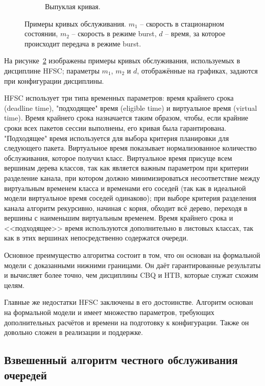 \begin{figure}[ht!]
\begin{subfigure}[b]{0.3\textwidth}
                \caption{Выпуклая кривая.}
                \label{pic:hfsc_convex}
            \end{subfigure}
			\caption{Примеры кривых обслуживания. $m_1$ -- скорость в стационарном состоянии,
			$m_2$ -- скорость в режиме burst, $d$ -- время, за которое происходит передача
			в режиме burst.\cite{hfscguide}}
			\label{pic:hfscline}
        \end{figure}

		На рисунке~\ref{pic:hfscline} изображены примеры кривых обслуживания, используемых
		в дисциплине HFSC; параметры $m_1$, $m_2$ и $d$, отображённые на графиках, задаются
		при конфигурации дисциплины.\cite{hfscguide}

        HFSC использует три типа временных параметров: время крайнего срока (deadline
        time), "подходящее" время (eligible time) и виртуальное время (virtual time). Время крайнего
        срока назначается таким образом, чтобы, если крайние сроки всех пакетов сессии
        выполнены, его кривая была гарантирована. "Подходящее" время используется для
        выбора критерия планировки для следующего пакета. Виртуальное время показывает
        нормализованное количество обслуживания, которое получил класс. Виртуальное
        время присуще всем вершинам дерева классов, так как является важным параметром
        при критерии разделение канала, при котором должно минимизироваться
        несоответствие между виртуальным временем класса и временами его соседей
        (так как в идеальной модели виртуальное время соседей одинаково); при выборе
        критерия разделения канала алгоритм рекурсивно, начиная с корня, обходит всё
        дерево, переходя в вершины с наименьшим виртуальным временем. Время крайнего
        срока и <<подходящее>> время используются дополнительно в листовых классах,
        так как в этих вершинах непосредственно содержатся очереди.\cite{hfsc}

		Основное преимущество алгоритма состоит в том, что он основан
		на формальной модели с доказанными нижними границами. Он даёт гарантированные
		результаты и вычисляет более точно, чем дисциплины CBQ и HTB, которые
		служат схожим целям.

		Главные же недостатки HFSC заключены в его достоинстве. Алгоритм основан
		на формальной модели и имеет множество параметров, требующих дополнительных
		расчётов и времени на подготовку к конфигурации. Также он довольно сложен
		в реализации и поддержке. 

    \subsection{Взвешенный алгоритм честного обслуживания очередей}

